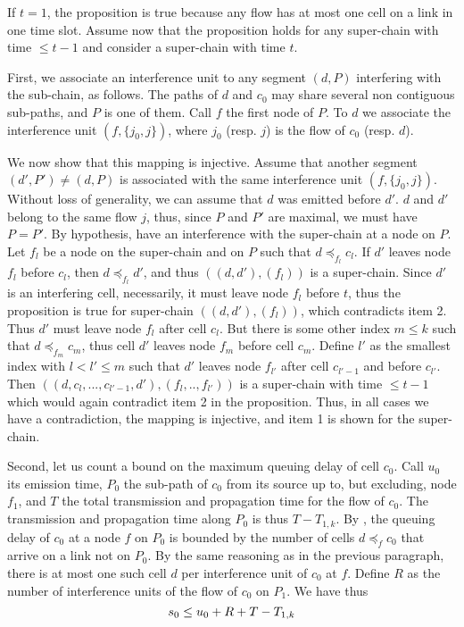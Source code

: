 If $t=1$, the proposition is true because any flow has at most one
cell on a link in one time slot. Assume now that the proposition
holds for any super-chain with time $\leq t-1$ and consider a
super-chain with time $t$.

First, we associate an interference unit to any segment $(d, P)$
interfering with the sub-chain, as follows. The paths of $d$ and
$c_0$ may share several non contiguous sub-paths, and $P$ is one
of them. Call $f$ the first node of $P$. To $d$ we associate the
interference unit $(f, \{j_0, j\})$, where $j_0$ (resp. $j$) is
the flow of $c_0$ (resp. $d$).

We now show that this mapping is injective. Assume that another
segment $(d', P') \neq (d, P)$ is associated with the same
interference unit $(f, \{j_0, j\})$. Without loss of generality,
we can assume that $d$ was emitted before $d'$. $d$ and $d'$
belong to the same flow $j$, thus, since $P$ and $P'$ are maximal,
we must have $P=P'$. By hypothesis, have an interference with the
super-chain at a node on $P$. Let $f_l$ be a node on the
super-chain and on $P$ such that $d\preccurlyeq_{f_l} c_l$. If
$d'$ leaves node $f_l$ before $c_l$, then $d\preccurlyeq_{f_l}
d'$, and thus $((d, d'),(f_l))$ is a super-chain. Since $d'$ is an
interfering cell, necessarily, it must leave node $f_l$ before
$t$, thus the proposition is true for super-chain $((d,
d'),(f_l))$, which contradicts item 2. Thus $d'$ must leave node
$f_l$ after cell $c_l$. But there is some other index $m \leq k$
such that $d\preccurlyeq_{f_m} c_m$, thus cell $d'$ leaves node
$f_m$ before cell $c_m$. Define $l'$ as the smallest index with $l
< l' \leq m$ such that $d'$ leaves node $f_{l'}$ after cell
$c_{l'-1}$ and before $c_{l'}$. Then $((d, c_l, ..., c_{l'-1},
d'),(f_l, ..,f_{l'}))$ is a super-chain with time $\leq t-1$ which
would again contradict item 2 in the proposition. Thus, in all
cases we have a contradiction, the mapping is injective, and item
1 is shown for the super-chain.

Second, let us count a bound on the maximum queuing delay of cell
$c_0$. Call $u_0$ its emission time, $P_0$ the sub-path of $c_0$
from its source up to, but excluding, node $f_1$, and $T$ the
total transmission and propagation time for the flow of $c_0$. The
transmission and propagation time along $P_0$ is thus $T-T_{1,k}$.
By , the queuing delay of $c_0$ at a node $f$
on $P_0$ is bounded by the number of cells $d \preccurlyeq_{f}
c_0$ that arrive on a link not on $P_0$. By the same reasoning as
in the previous paragraph, there is at most one such cell $d$ per
interference unit of $c_0$ at $f$. Define $R$ as the number of
interference units of the flow of $c_0$ on $P_1$. We have thus
\begin{equation}\mylabel{eq-tonfifopr332}
 s_0 \leq u_0 + R + T-T_{1,k}
\end{equation}

